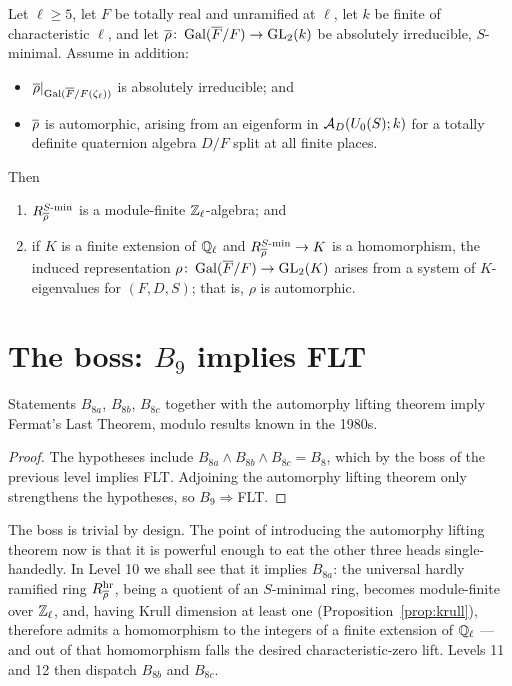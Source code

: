 \documentclass[11pt]{article}
\begin{document}
\begin{theorem}\label{thm:alt}
Let $\ell\geq5$, let $F$ be totally real and unramified at $\ell$, let $k$ be
finite of characteristic $\ell$, and let $\overline{\rho}\colon\operatorname{Gal}(\overline{F}/F)\to\operatorname{GL}_2(k)$ be
absolutely irreducible, $S$-minimal. Assume in addition:
\begin{itemize}
\item $\overline{\rho}|_{\operatorname{Gal}(\overline{F}/F(\zeta_\ell))}$ is absolutely irreducible; and
\item $\overline{\rho}$ is automorphic, arising from an eigenform in
$\mathcal{A}_D(U_0(S);k)$ for a totally definite quaternion algebra $D/F$ split at all
finite places.
\end{itemize}
Then
\begin{enumerate}
\item[\textup{(a)}] $R^{S\text{-}\mathrm{min}}_{\overline{\rho}}$ is a module-finite
$\mathbb{Z}_\ell$-algebra; and
\item[\textup{(b)}] if $K$ is a finite extension of $\mathbb{Q}_\ell$ and
$R^{S\text{-}\mathrm{min}}_{\overline{\rho}}\to K$ is a homomorphism, the induced
representation $\rho\colon\operatorname{Gal}(\overline{F}/F)\to\operatorname{GL}_2(K)$ arises from a system of $K$-eigenvalues
for $(F,D,S)$; that is, $\rho$ is automorphic.
\end{enumerate}
\end{theorem}

\section{The boss: $B_9$ implies FLT}

\begin{theorem}\label{thm:boss9}
Statements $B_{8a}$, $B_{8b}$, $B_{8c}$ together with the automorphy lifting
theorem imply Fermat's Last Theorem, modulo results known in the 1980s.
\end{theorem}

\begin{proof}
The hypotheses include $B_{8a}\wedge B_{8b}\wedge B_{8c}=B_8$, which by the boss
of the previous level implies FLT. Adjoining the automorphy lifting theorem only
strengthens the hypotheses, so $B_9\Rightarrow{}$FLT.
\end{proof}

\begin{remark}
The boss is trivial by design. The point of introducing the automorphy lifting
theorem now is that it is powerful enough to eat the other three heads
single-handedly. In Level 10 we shall see that it implies $B_{8a}$: the
universal hardly ramified ring $R^{\mathrm{hr}}_{\overline{\rho}}$, being a quotient of an
$S$-minimal ring, becomes module-finite over $\mathbb{Z}_\ell$, and, having Krull dimension
at least one (Proposition~\ref{prop:krull}), therefore admits a homomorphism to
the integers of a finite extension of $\mathbb{Q}_\ell$ --- and out of that homomorphism
falls the desired characteristic-zero lift. Levels 11 and 12 then dispatch
$B_{8b}$ and $B_{8c}$.
\end{remark}
\end{document}
